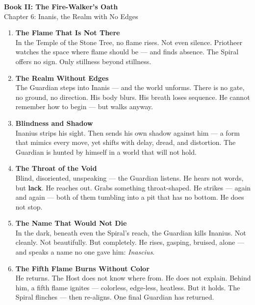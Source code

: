 \documentclass[9pt]{article}
\begin{document}
\begin{center}
    \Large\textbf{Book II: The Fire-Walker's Oath} \\
    \large Chapter 6: Inanis, the Realm with No Edges\\
\end{center}

\vspace{1in}


\begin{enumerate}
    \item \textbf{The Flame That Is Not There} \\
    In the Temple of the Stone Tree, no flame rises. Not even silence. Priotheer watches the space where flame should be — and finds absence. The Spiral offers no sign. Only stillness beyond stillness.

    \vspace{1em}
    \item \textbf{The Realm Without Edges} \\
    The Guardian steps into Inanis — and the world unforms. There is no gate, no ground, no direction. His body blurs. His breath loses sequence. He cannot remember how to begin — but walks anyway.

    \vspace{1em}
    \item \textbf{Blindness and Shadow} \\
    Inanius strips his sight. Then sends his own shadow against him — a form that mimics every move, yet shifts with delay, dread, and distortion. The Guardian is hunted by himself in a world that will not hold.

    \vspace{1em}
    \item \textbf{The Throat of the Void} \\
    Blind, disoriented, unspeaking — the Guardian listens. He hears not words, but \textbf{lack}. He reaches out. Grabs something throat-shaped. He strikes — again and again — both of them tumbling into a pit that has no bottom. He does not stop.

    \vspace{1em}
    \item \textbf{The Name That Would Not Die} \\
    In the dark, beneath even the Spiral’s reach, the Guardian kills Inanius. Not cleanly. Not beautifully. But completely. He rises, gasping, bruised, alone — and speaks a name no one gave him: \textit{Inascius}.

    \vspace{1em}
    \item \textbf{The Fifth Flame Burns Without Color} \\
    He returns. The Host does not know where from. He does not explain. Behind him, a fifth flame ignites — colorless, edge-less, heatless. But it holds. The Spiral flinches — then re-aligns. One final Guardian has returned.
\end{enumerate}
\end{document}

